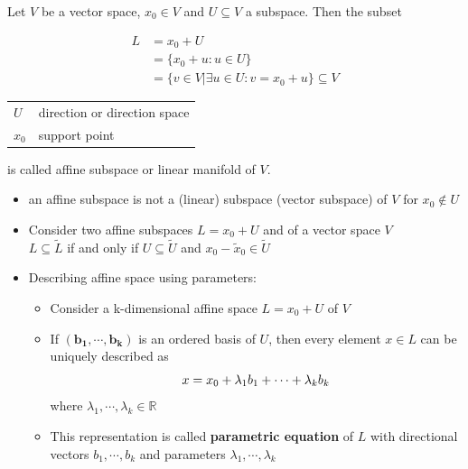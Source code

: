 Let $V$ be a vector space, $x_0 \in V$ and $U \subseteq V$ a subspace. Then the subset

\begin{table}[h]
    \begin{minipage}{0.49\linewidth}
        \begin{align*}
            L &= x_0 + U\\
             &= \{x_0 + u : u \in U\} \\
             &= \{v \in V | \exists u \in U : v = x_0 + u\} \subseteq V
        \end{align*}
    \end{minipage}
    \hfill
    \begin{minipage}{0.49\linewidth}
        \begin{table}[H]
            \begin{tabular}{l l}
                $U$ & direction or direction space \\
                $x_0$ & support point \\
            \end{tabular}
        \end{table}
    \end{minipage}
\end{table}

is called affine subspace or linear manifold of $V$. 


\begin{itemize}
    \item an affine subspace is not a (linear) subspace (vector subspace) of $V$ for $x_0 \not\in U$

    \item Consider two affine subspaces $L = x_0 + U$ and  of a vector space $V$\\
    $L \subseteq \tilde{L}$ if and only if $U \subseteq \tilde{U}$ and $x_0 - \tilde{x}_0 \in \tilde{U}$
    
    \item Describing affine space using parameters:
    \begin{itemize}
        \item Consider a k-dimensional affine space $L = x_0 + U$ of $V$

        \item If $\mathbf{(b_1, \cdots , b_k)}$ is an ordered basis of $U$, then every element $x \in L$ can be uniquely described as
        \[
            \hfill 
            x = x_0 + \lambda_1b_1 + \cdots + \lambda_kb_k 
            \hfill
        \]
        where $\lambda_1, \cdots , \lambda_k \in \mathbb{R}$

        \item This representation is called \textbf{parametric equation} of $L$ with directional vectors $b_1, \cdots , b_k$ and parameters $\lambda_1, \cdots , \lambda_k$
        
    \end{itemize}
    
\end{itemize}


